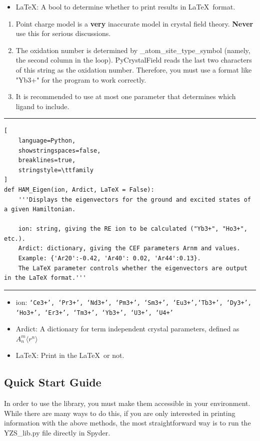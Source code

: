 \documentclass{article}
\begin{document}
\begin{itemize}
\item LaTeX: A bool to determine whether to print results in \LaTeX\ format.
\end{itemize}

\begin{enumerate}
\item Point charge model is a \textbf{very} inaccurate model in crystal field theory. \textbf{Never} use this for serious discussions.
\item The oxidation number is determined by \_atom\_site\_type\_symbol (namely, the second column in the loop). PyCrystalField reads the last two characters of this string as the oxidation number. Therefore, you must use a format like "Yb3+" for the program to work correctly.
\item It is recommended to use at most one parameter that determines which ligand to include.
\end{enumerate}

\bigskip
\bigskip
\hrule
\begin{lstlisting}[
    language=Python, 
    showstringspaces=false, 
    breaklines=true,
    stringstyle=\ttfamily
]
def HAM_Eigen(ion, Ardict, LaTeX = False):
    '''Displays the eigenvectors for the ground and excited states of a given Hamiltonian.
    
    ion: string, giving the RE ion to be calculated ("Yb3+", "Ho3+", etc.).
    Ardict: dictionary, giving the CEF parameters Arnm and values. 
    Example: {'Ar20':-0.42, 'Ar40': 0.02, 'Ar44':0.13}.
    The LaTeX parameter controls whether the eigenvectors are output in the LaTeX format.'''
\end{lstlisting}
\hrule
\smallskip
{} 
\begin{itemize}
\item ion: \texttt{`Ce3+', `Pr3+', `Nd3+', `Pm3+', `Sm3+', `Eu3+',`Tb3+', `Dy3+', `Ho3+', `Er3+', `Tm3+', `Yb3+', `U3+', `U4+'}
\item Ardict: A dictionary for term independent crystal parameters, defined as $A_n^m\langle r^n \rangle$
\item LaTeX: Print in the \LaTeX\ or not.
\end{itemize}

\subsection*{Quick Start Guide}
In order to use the library, you must make them accessible in your environment. While there are many ways to do this, if you are only interested in printing information with the above methods, the most straightforward way is to run the YZS\_lib.py file directly in Spyder.
\end{document}
